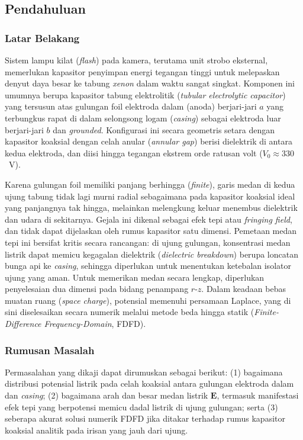 \documentclass[11pt,a4paper]{article}
\begin{document}
\subsection{Pendahuluan}

\subsubsection{Latar Belakang}
Sistem lampu kilat (\textit{flash}) pada kamera, terutama unit strobo eksternal, memerlukan kapasitor penyimpan energi tegangan tinggi untuk melepaskan denyut daya besar ke tabung \textit{xenon} dalam waktu sangat singkat. Komponen ini umumnya berupa kapasitor tabung elektrolitik (\textit{tubular electrolytic capacitor}) yang tersusun atas gulungan foil elektroda dalam (anoda) berjari-jari $a$ yang terbungkus rapat di dalam selongsong logam (\textit{casing}) sebagai elektroda luar berjari-jari $b$ dan \textit{grounded}. Konfigurasi ini secara geometris setara dengan kapasitor koaksial dengan celah anular (\textit{annular gap}) berisi dielektrik di antara kedua elektroda, dan diisi hingga tegangan ekstrem orde ratusan volt ($V_0 \approx 330$~V).

Karena gulungan foil memiliki panjang berhingga (\textit{finite}), garis medan di kedua ujung tabung tidak lagi murni radial sebagaimana pada kapasitor koaksial ideal yang panjangnya tak hingga, melainkan melengkung keluar menembus dielektrik dan udara di sekitarnya. Gejala ini dikenal sebagai efek tepi atau \textit{fringing field}, dan tidak dapat dijelaskan oleh rumus kapasitor satu dimensi. Pemetaan medan tepi ini bersifat kritis secara rancangan: di ujung gulungan, konsentrasi medan listrik dapat memicu kegagalan dielektrik (\textit{dielectric breakdown}) berupa loncatan bunga api ke \textit{casing}, sehingga diperlukan untuk menentukan ketebalan isolator ujung yang aman. Untuk memerikan medan secara lengkap, diperlukan penyelesaian dua dimensi pada bidang penampang $r$-$z$. Dalam keadaan bebas muatan ruang (\textit{space charge}), potensial memenuhi persamaan Laplace, yang di sini diselesaikan secara numerik melalui metode beda hingga statik (\textit{Finite-Difference Frequency-Domain}, FDFD).

\subsubsection{Rumusan Masalah}
Permasalahan yang dikaji dapat dirumuskan sebagai berikut: (1) bagaimana distribusi potensial listrik pada celah koaksial antara gulungan elektroda dalam dan \textit{casing}; (2) bagaimana arah dan besar medan listrik $\mathbf{E}$, termasuk manifestasi efek tepi yang berpotensi memicu dadal listrik di ujung gulungan; serta (3) seberapa akurat solusi numerik FDFD jika ditakar terhadap rumus kapasitor koaksial analitik pada irisan yang jauh dari ujung.
\end{document}
